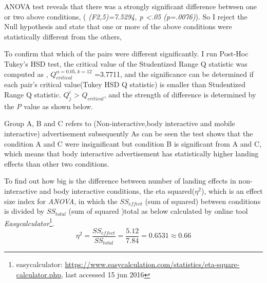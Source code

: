 ANOVA test reveals that there was a strongly significant difference between one or two above conditions, ( \emph{(F2,5)=7.5294, p <.05 (p=.0076)}). So I reject the Null hypothesis and state that one or more of the above conditions were statistically different from the others, 

To confirm that which of the pairs were different significantly. I run Post-Hoc Tukey’s HSD test, the critical value of the Studentized Range Q statistic was computed as , ${Q}_{critical}^{\alpha=0.05,k=12}$ =3.7711, and the significance can be determined if each pair’s critical value(Tukey HSD Q statistic) is smaller than Studentized Range Q statistic. ${Q}_{j}^{i }$ > ${Q}_{critical}$, and the strength of difference is determined by the \emph{P} value as shown below.

\begin{table}[H]
\caption{Post-Hoc Tukey’s HSD results}
\label{tab:landing-non-posthoctukey}
\centering
{}
\end{table}


Group A, B and C refers to (Non-interactive,body interactive and mobile interactive) advertisement subsequently  As can be seen the test shows that the condition A and C were insignificant but condition B is significant from A and C, which means that body interactive advertisement has statistically higher landing effects than other two conditions.

To find out how big is the difference between number of landing effects in non-interactive and body interactive conditions, the eta squared(${\eta}^2$), which is an effect size index for \emph{ANOVA}, in which the $SS_{effect}$ (sum of squared) between conditions is divided by $SS_{total}$  (sum of squared )total as below calculated by online tool \emph{Easycalculator}\footnote{easycalculator: \url{https://www.easycalculation.com/statistics/eta-square-calculator.php}, last accessed 15 jun 2016}.
\[
{\eta}^2 = \frac{{SS}_{effect}}{{SS}_{total}} = \frac{5.12}{7.84} = 0.6531 \approx 0.66
\]

